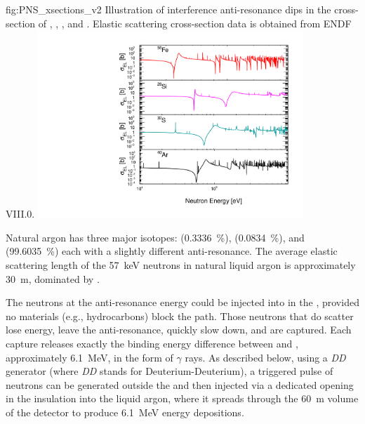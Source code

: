 \begin{dunefigure}{fig:PNS_xsections_v2}
{Illustration of interference anti-resonance dips in the cross-section of , , , and . Elastic scattering cross-section data is obtained from ENDF VIII.0.}
\includegraphics[width=10cm]{graphics/PNS_xsection.pdf}
\end{dunefigure}

Natural argon has three major isotopes:  (\SI{0.3336}{\%}),  (\SI{0.0834}{\%}), and  (\SI{99.6035}{\%}) each with a slightly different anti-resonance. The average elastic scattering length of the \SI{57}{\keV} neutrons in natural liquid argon is approximately \SI{30}{\m}, dominated by .

The neutrons at the anti-resonance energy could be injected into  in the , provided no materials (e.g., hydrocarbons) block the path. Those neutrons that do scatter lose energy, leave the anti-resonance, quickly slow down, and are captured. Each capture releases exactly the binding energy difference between  and , approximately \SI{6.1}{\MeV}, in the form of $\gamma$ rays.  As described below, using a {\it DD} generator (where {\it DD} stands for Deuterium-Deuterium), a triggered pulse of neutrons can be generated outside the  and then injected via a dedicated opening in the insulation into the liquid argon, where it spreads through the \SI{60}{\m} volume of the detector to produce \SI{6.1}{\MeV} energy depositions. 

